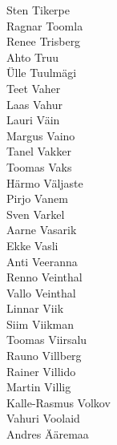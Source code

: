 \begin{multicols}{3}
Sten Tikerpe\\
Ragnar Toomla\\
Renee Trisberg\\
Ahto Truu\\
Ülle Tuulmägi\\
Teet Vaher\\
Laas Vahur\\
Lauri Väin\\
Margus Vaino\\
Tanel Vakker\\
Toomas Vaks\\
Härmo Väljaste\\
Pirjo Vanem\\
Sven Varkel\\
Aarne Vasarik\\
Ekke Vasli\\
Anti Veeranna\\
Renno Veinthal\\
Vallo Veinthal\\
Linnar Viik\\
Siim Viikman\\
Toomas Viirsalu\\
Rauno Villberg\\
Rainer Villido\\
Martin Villig\\
Kalle-Rasmus Volkov\\
Vahuri Voolaid\\
Andres Ääremaa\\
\end{multicols}
